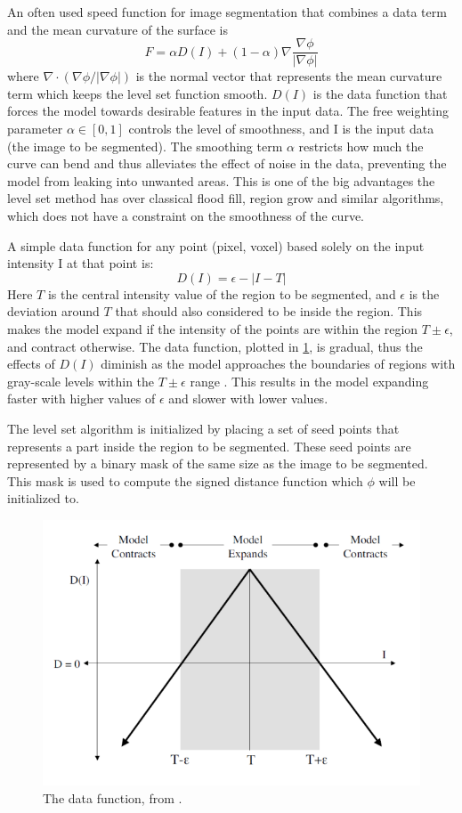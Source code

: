 An often used speed function for image segmentation that combines a data term and the mean curvature of the surface is \cite{cates03,lefohn04}
\begin{equation}
F = \alpha D(I) + (1-\alpha) \nabla \frac{\nabla \phi}{|\nabla \phi|}
\end{equation} 
where \(\nabla \cdot (\nabla \phi / |\nabla \phi|)\) is the normal vector that represents the mean curvature term which keeps the level set function smooth. \(D(I)\) is the data function that forces the model towards desirable features in the input data. The free weighting parameter \(\alpha \in{[0,1]}\) controls the level of smoothness, and I is the input data (the image to be segmented). The smoothing term \(\alpha\) restricts how much the curve can bend and thus alleviates the effect of noise in the data, preventing the model from leaking into unwanted areas\cite{lefohn04}. This is one of the big advantages the level set method has over classical flood fill, region grow and similar algorithms, which does not have a constraint on the smoothness of the curve.

A simple data function for any point (pixel, voxel) based solely on the input intensity I at that point\cite{cates03,lefohn04} is:
\begin{equation}
D(I) = \epsilon - |I - T|
\label{dataTermFunc}
\end{equation} 
Here \(T\) is the central intensity value of the region to be segmented, and \(\epsilon\) is the deviation around \(T\) that should also considered to be inside the region. This makes the model expand if the intensity of the points are within the region \(T \pm \epsilon\), and contract otherwise. The data function, plotted in \ref{dataTermPlot}, is gradual, thus the effects of \(D(I)\) diminish as the model approaches the boundaries of regions with gray-scale levels within the \(T \pm \epsilon\) range \cite{lefohn04}. This results in the model expanding faster with higher values of \(\epsilon\) and slower with lower values. 

The level set algorithm is initialized by placing a set of seed points that represents a part inside the region to be segmented. These seed points are represented by a binary mask of the same size as the image to be segmented. This mask is used to compute the signed distance function which \(\phi\) will be initialized to. 
\begin{figure}[H]
\centering
\includegraphics[width=.65\textwidth]{backgroundTheory/levelset/dataTerm}
\caption{The data function, from \cite{cates03}.}
\label{dataTermPlot}
\end{figure}

